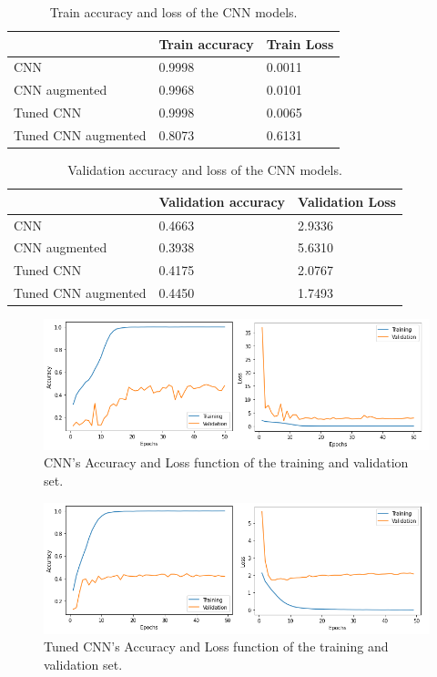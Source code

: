 \begin{table}[ht]
\begin{tabular}{|l|l|l|}
\hline
                    & Train accuracy & Train Loss \\ \hline
CNN                 & 0.9998         & 0.0011     \\ \hline
CNN augmented       & 0.9968         & 0.0101     \\ \hline
Tuned CNN           & 0.9998         & 0.0065     \\ \hline
Tuned CNN augmented & 0.8073         & 0.6131     \\ \hline
\end{tabular}
\caption{Train accuracy and loss of the CNN models.}
\label{table:train_CNN}
\end{table}

\begin{table}[ht]
\begin{tabular}{|l|l|l|}
\hline
                    & Validation accuracy & Validation Loss \\ \hline
CNN                 & 0.4663              & 2.9336          \\ \hline
CNN augmented       & 0.3938              & 5.6310          \\ \hline
Tuned CNN           & 0.4175              & 2.0767          \\ \hline
Tuned CNN augmented & 0.4450              & 1.7493          \\ \hline
\end{tabular}
\caption{Validation accuracy and loss of the CNN models.}
\label{table:validation_CNN}
\end{table}

\begin{figure}[ht]
\centering
\includegraphics[scale=0.6]{images/2021-val-train.png}
\caption{CNN's Accuracy and Loss function of the training and validation set.}
\label{fig:Acc_Loss_2021}
\end{figure}


\begin{figure}[ht]
\centering
\includegraphics[scale=0.6]{images/tuned-val-train.png}
\caption{Tuned CNN's Accuracy and Loss function of the training and validation set.}
\label{fig:Acc_Loss_tuned}
\end{figure}

